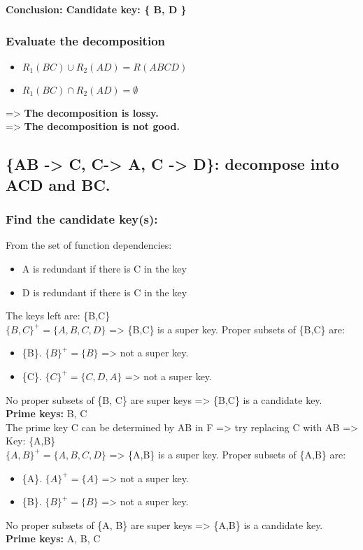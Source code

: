 \textbf{Conclusion: Candidate key: \{ B, D \}}

\subsubsection{Evaluate the decomposition}
\begin{itemize}
    \item $R_{1}(BC) \cup R_{2}(AD) = R(ABCD)$
    \item $R_{1}(BC) \cap R_{2}(AD) = \emptyset$
\end{itemize}
=> \textbf{The decomposition is lossy.} \\
=> \textbf{The decomposition is not good.}


\newpage
\subsection{\{AB -> C, C-> A, C -> D\}: decompose into ACD and BC.}
\subsubsection{Find the candidate key(s):}
From the set of function dependencies:
\begin{itemize}
    \item A is redundant if there is C in the key
    \item D is redundant if there is C in the key
\end{itemize}
The keys left are: \{B,C\} \\
$\{B,C\}^{+} = \{A,B,C,D\}$ => \{B,C\} is a super key.
Proper subsets of \{B,C\} are:
\begin{itemize}
    \item \{B\}. $\{B\}^{+} = \{B\}$ => not a super key.
    \item \{C\}. $\{C\}^{+} = \{C, D, A\}$ => not a super key.
\end{itemize}
No proper subsets of \{B, C\} are super keys => \{B,C\} is a candidate key. \\
\textbf{Prime keys:} B, C \\

The prime key C can be determined by AB in F => try replacing C with AB => Key: \{A,B\} \\
$\{A, B\}^{+} = \{A,B,C,D\}$ => \{A,B\} is a super key.
Proper subsets of \{A,B\} are:
\begin{itemize}
    \item \{A\}. $\{A\}^{+} = \{A\}$ => not a super key.
    \item \{B\}. $\{B\}^{+} = \{B\}$ => not a super key.
\end{itemize}
No proper subsets of \{A, B\} are super keys => \{A,B\} is a candidate key. \\
\textbf{Prime keys:} A, B, C \\

